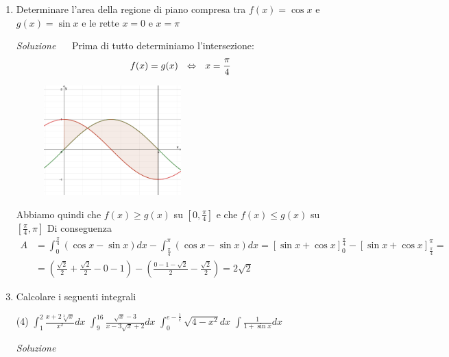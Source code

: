 \documentclass{article}
\begin{document}
\begin{enumerate}[label=\textbf{Esercizio 11.\arabic*.},itemindent=*]
\item Determinare l'area della regione di piano compresa tra $f(x)=\cos x$ e $g(x)=\sin x$ e le rette $x=0$ e $x=\pi$
\item[\textit{\large Soluzione~}]~
Prima di tutto determiniamo l'intersezione:
\[f(x)=g(x)~~\Leftrightarrow~~x=\frac{\pi}{4}\]
\begin{figure}[h]
    \centering
    \includegraphics[width=0.5\textwidth]{src/es2.png}
    \caption{}
    \label{fig:es2}
\end{figure}
Abbiamo quindi che $f(x)\geq g(x)$ su $\left[ 0,\frac{\pi}{4} \right]$ e che $f(x)\leq g(x)$ su $\left[ \frac{\pi}{4} , \pi\right]$
Di conseguenza 
\[\begin{aligned}A&=\int _0^{\frac{\pi}{4}}(\cos x-\sin x)dx-\int_{\frac{\pi}{4}}^\pi(\cos x -\sin x)dx=[\sin x+\cos x]_0^{\frac{\pi}{4}}-[\sin x+\cos x]_{\frac{\pi}{4}}^\pi=\\ &=\left(\frac{\sqrt{2}}{2}+\frac{\sqrt{2}}{2}-0-1\right)-\left(\frac{0-1-\sqrt{2}}{2}-\frac{\sqrt{2}}{2}\right)=2\sqrt{2}\end{aligned}\]
\item Calcolare i seguenti integrali
\begin{tasks}(4)
    \task \(\int_{1}^{2}\frac{x+2\sqrt[3]{x}}{x^2}dx\)
    \task \(\int_{9}^{16}\frac{\sqrt{x}-3}{x-3\sqrt{x}+2}dx\)
    \task \(\int_{0}^{e-\frac{1}{e}}\sqrt{4-x^2}dx\)
    \task \(\int\frac{1}{1+\sin x}dx\)
\end{tasks}
\item[\textit{\large Soluzione~}]~

\end{enumerate}
\end{document}
